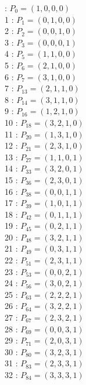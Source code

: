 \documentclass{article}
\begin{document}
{\begin{multicols}{3}
 : $P_{0}=( 1, 0, 0, 0 )$\\
1 : $P_{1}=( 0, 1, 0, 0 )$\\
2 : $P_{2}=( 0, 0, 1, 0 )$\\
3 : $P_{3}=( 0, 0, 0, 1 )$\\
4 : $P_{5}=( 1, 1, 0, 0 )$\\
5 : $P_{6}=( 2, 1, 0, 0 )$\\
6 : $P_{7}=( 3, 1, 0, 0 )$\\
7 : $P_{13}=( 2, 1, 1, 0 )$\\
8 : $P_{14}=( 3, 1, 1, 0 )$\\
9 : $P_{16}=( 1, 2, 1, 0 )$\\
10 : $P_{18}=( 3, 2, 1, 0 )$\\
11 : $P_{20}=( 1, 3, 1, 0 )$\\
12 : $P_{21}=( 2, 3, 1, 0 )$\\
13 : $P_{27}=( 1, 1, 0, 1 )$\\
14 : $P_{33}=( 3, 2, 0, 1 )$\\
15 : $P_{36}=( 2, 3, 0, 1 )$\\
16 : $P_{38}=( 0, 0, 1, 1 )$\\
17 : $P_{39}=( 1, 0, 1, 1 )$\\
18 : $P_{42}=( 0, 1, 1, 1 )$\\
19 : $P_{45}=( 0, 2, 1, 1 )$\\
20 : $P_{48}=( 3, 2, 1, 1 )$\\
21 : $P_{49}=( 0, 3, 1, 1 )$\\
22 : $P_{51}=( 2, 3, 1, 1 )$\\
23 : $P_{53}=( 0, 0, 2, 1 )$\\
24 : $P_{56}=( 3, 0, 2, 1 )$\\
25 : $P_{63}=( 2, 2, 2, 1 )$\\
26 : $P_{64}=( 3, 2, 2, 1 )$\\
27 : $P_{67}=( 2, 3, 2, 1 )$\\
28 : $P_{69}=( 0, 0, 3, 1 )$\\
29 : $P_{71}=( 2, 0, 3, 1 )$\\
30 : $P_{80}=( 3, 2, 3, 1 )$\\
31 : $P_{83}=( 2, 3, 3, 1 )$\\
32 : $P_{84}=( 3, 3, 3, 1 )$\\
\end{multicols}


%


%


}%
\end{document}
